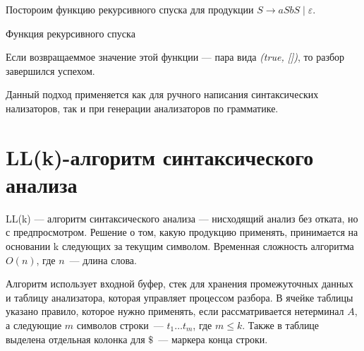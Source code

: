 \begin{example}

Постороим функцию рекурсивного спуска для продукции $S \rightarrow aSbS \mid \varepsilon$.

\begin{algorithm}
\begin{algorithmic}[1]
\caption{Функция рекурсивного спуска}
    \EndIf 
       
         \Else
        \EndIf
    \Else
    \EndIf           
\EndFunction

\end{algorithmic}
\end{algorithm}
\end{example}

Если возвращаеммое значение этой функции  --- пара вида \textit{(true, [])}, то разбор завершился успехом.

Данный подход применяется как для ручного написания синтаксических нализаторов, так и при генерации анализаторов по грамматике. 

\section{LL(k)-алгоритм синтаксического анализа}

LL(k) --- алгоритм синтаксического анализа --- нисходящий анализ без отката, но с предпросмотром. 
Решение о том, какую продукцию применять, принимается на основании k следующих за текущим символом. 
Временная сложность алгоритма $O(n)$, где $n$~--- длина слова. 

Алгоритм использует входной буфер, стек для хранения промежуточных данных и таблицу анализатора, которая управляет процессом разбора. 
В ячейке таблицы указано правило, которое нужно применять, если рассматривается нетерминал $A$, а следующие $m$ символов строки~--- $t_{1} \dots t_{m}$, где $m \leq k$. 
Также в таблице выделена отдельная колонка для $\$$~--- маркера конца строки. 

